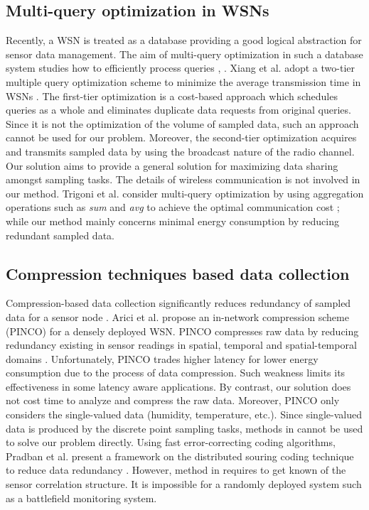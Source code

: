 \documentclass[prodmode,acmtosn]{acmsmall}
\begin{document}
\subsection{Multi-query optimization in  WSNs}
Recently, a WSN is treated as a database providing a good logical abstraction for sensor data management. The aim of multi-query optimization in such a database system studies how to efficiently process queries \cite{2007_two_tier_icdcs}, \cite{2005_multi_query}. Xiang et al. adopt a two-tier multiple query optimization scheme to minimize the average transmission time in WSNs \cite{2007_two_tier_icdcs}. The first-tier optimization is a cost-based approach which schedules queries as a whole and eliminates duplicate data requests from original queries. Since it is not the optimization of the volume of sampled data, such an approach cannot be used for our problem. Moreover, the second-tier optimization acquires and transmits sampled data by using the broadcast nature of the radio channel. Our solution aims to provide a general solution for maximizing data sharing amongst sampling tasks. The details of wireless communication is not involved in our method.  Trigoni et al. consider multi-query optimization by using aggregation operations such as \emph{sum} and \emph{avg} to achieve the optimal communication cost \cite{2005_multi_query}; while our method mainly concerns minimal energy consumption by reducing redundant sampled data.

\subsection{Compression techniques based data collection}
Compression-based data collection significantly reduces redundancy of sampled data for a sensor node \cite{2003_PINCO,2002_distributed_compression}. Arici et al. propose an in-network compression scheme (PINCO) for a densely deployed WSN. PINCO compresses raw data by reducing redundancy existing in sensor readings in spatial, temporal and spatial-temporal domains \cite{2003_PINCO}. Unfortunately, PINCO trades higher latency for lower energy consumption due to the process of data compression. Such weakness limits its effectiveness in some latency aware applications. By contrast, our solution does not cost time to analyze and compress the raw data. Moreover, PINCO only considers the single-valued data (humidity, temperature, etc.).  Since single-valued data is produced by the discrete point sampling tasks, methods in \cite{2003_PINCO} cannot be used to solve our problem directly. Using fast error-correcting coding algorithms, Pradban et al. present a framework on the distributed souring coding technique to reduce data redundancy \cite{2002_distributed_compression}. However, method in \cite{2002_distributed_compression} requires to get known of the sensor correlation structure. It is impossible for a randomly deployed system such as a battlefield monitoring system.
\end{document}
